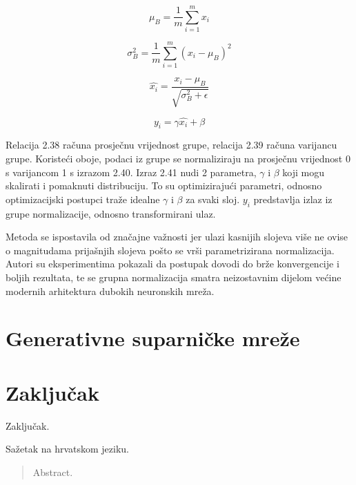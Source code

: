 \documentclass[times, utf8, diplomski]{fer}
\begin{document}
\begin{equation}
\mu_B = \frac{1}{m}\sum_{i=1}^m x_i
\end{equation}

\begin{equation}
\sigma_B^2 = \frac{1}{m}\sum_{i=1}^m (x_i - \mu_B)^2
\end{equation}

\begin{equation}
\hat{x_i} = \frac{x_i - \mu_B}{\sqrt{\sigma_B^2 + \epsilon}}
\end{equation}

\begin{equation}
y_i = \gamma \hat{x_i} + \beta
\end{equation}

Relacija 2.38 računa prosječnu vrijednost grupe, relacija 2.39 računa varijancu grupe. Koristeći oboje, podaci iz grupe se normaliziraju na prosječnu vrijednost 0 s varijancom 1 s izrazom 2.40. Izraz 2.41 nudi 2 parametra, $\gamma$ i $\beta$ koji mogu skalirati i pomaknuti distribuciju. To su optimizirajući parametri, odnosno optimizacijski postupci traže idealne $\gamma$ i $\beta$ za svaki sloj. $y_i$ predstavlja izlaz iz grupe normalizacije, odnosno transformirani ulaz. \par

Metoda se ispostavila od značajne važnosti jer ulazi kasnijih slojeva više ne ovise o magnitudama prijašnjih slojeva pošto se vrši parametrizirana normalizacija. Autori su eksperimentima pokazali da postupak dovodi do brže konvergencije i boljih rezultata, te se grupna normalizacija smatra neizostavnim dijelom većine modernih arhitektura dubokih neuronskih mreža.\par

\chapter{Generativne suparničke mreže}

\chapter{Zaključak}
Zaključak.




\begin{sazetak}
Sažetak na hrvatskom jeziku.

\end{sazetak}

\begin{abstract}
Abstract.

\end{abstract}
\end{document}
